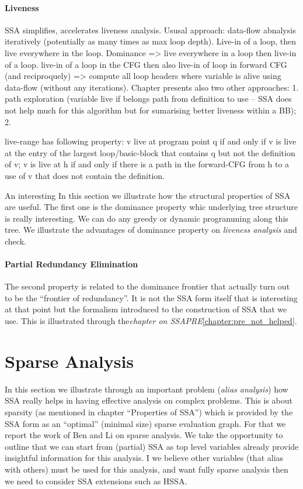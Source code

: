 \paragraph{Liveness}
SSA simplifies, accelerates liveness analysis.
Ususal approach: data-flow abnalysis iteratively (potentially as many times as max loop depth).
Live-in of a loop, then live everywhere in the loop.
Dominance => live everywhere in a loop then live-in of a loop.
live-in of a loop in the CFG then also live-in of loop in forward CFG (and reciproquely) => compute all loop headers where variable is alive using data-flow (without any iterations).
Chapter presents also two other approaches: 1. path exploration (variable live if belongs path from definition to use -- SSA does not help much for this algorithm but for sumarising better liveness within a BB); 2. 


live-range has following property: v live at program point q if and only if v is live at the entry of the largest loop/basic-block that contains q but not the definition of v; v is live at h if and only if there is a path in the forward-CFG from h to a use of v that does not contain the definition.


An interesting In this section we illustrate how the structural properties of SSA are useful. 
The first one is the dominance property whic underlying tree structure is really interesting. 
We can do any greedy or dynamic programming along this tree. 
We illustrate the advantages of dominance property on \emph{liveness analysis} and check. 

\paragraph{Partial Redundancy Elimination}
The second property is related to the dominance frontier that actually turn out to be the ``frontier of redundancy''. 
It is not the SSA form itself that is interesting at that point but the formalism introduced to the construction of SSA that we use. 
This is illustrated through the\emph{chapter on SSAPRE}\ref{chapter:pre_not_helped}.

\section{Sparse Analysis}
In this section we illustrate through an important problem (\emph{alias analysis}) how SSA really helps in having effective analysis on complex problems. 
This is about sparsity (as mentioned in chapter ``Properties of SSA'') which is provided by the SSA form as an ``optimal'' (minimal size) sparse evaluation graph. 
For that we report the work of Ben and Li on sparse analysis. 
We take the opportunity to outline that we can start from (partial) SSA as top level variables already provide insightful information for this analysis. 
I we believe other variables (that alias with others) must be used for this analysis, and want fully sparse analysis then we need to consider SSA extensions such as HSSA.





